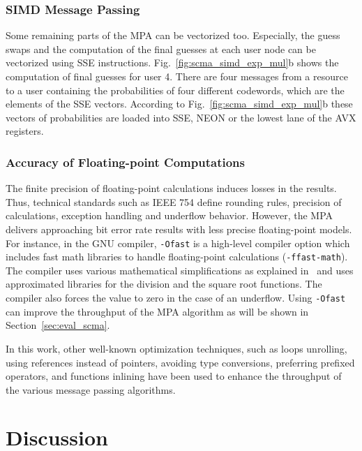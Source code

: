 \subsubsection{SIMD Message Passing}

Some remaining parts of the MPA can be vectorized too. Especially, the guess
swaps and the computation of the final guesses at each user node can be
vectorized using SSE instructions. Fig.~\ref{fig:scma_simd_exp_mul}b shows the
computation of final guesses for user 4. There are four messages from a resource
to a user containing the probabilities of four different codewords, which are
the elements of the SSE vectors. According to Fig.~\ref{fig:scma_simd_exp_mul}b
these vectors of probabilities are loaded into SSE, NEON or the lowest lane of
the AVX registers.

\subsubsection{Accuracy of Floating-point Computations}
\label{sec:opt_scma_float}

The finite precision of floating-point calculations induces losses in the
results. Thus, technical standards such as IEEE 754 define rounding rules,
precision of calculations, exception handling and underflow behavior. However,
the MPA delivers approaching bit error rate results with less precise
floating-point models. For instance, in the GNU compiler, \verb|-Ofast| is a
high-level compiler option which includes fast math libraries to handle
floating-point calculations (\verb|-ffast-math|). The compiler uses various
mathematical simplifications as explained in~\cite{Gccfp2018} and uses
approximated libraries for the division and the square root functions. The
compiler also forces the value to zero in the case of an underflow. Using
\verb|-Ofast| can improve the throughput of the MPA algorithm as will be shown
in Section~\ref{sec:eval_scma}.

In this work, other well-known optimization techniques, such as loops unrolling,
using references instead of pointers, avoiding type conversions, preferring
prefixed operators, and functions inlining have been used to enhance the
throughput of the various message passing algorithms.

\section{Discussion}

